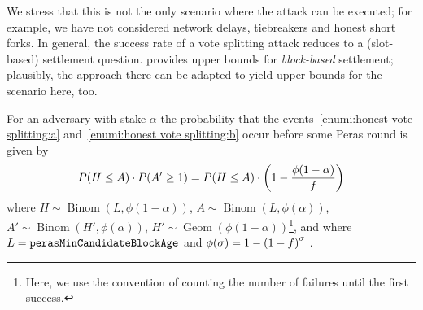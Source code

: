 We stress that this is not the only scenario where the attack can be executed; for example, we have not considered network delays, tiebreakers and honest short forks.
In general, the success rate of a vote splitting attack reduces to a (slot-based) settlement question. \Cite{gavzi2023practical} provides upper bounds for \emph{block-based} settlement; plausibly, the approach there can be adapted to yield upper bounds for the scenario here, too.

\begin{lemma}\label{lemma:honest vote splitting prob}
  For an adversary with stake $\alpha$ the probability that the events~\ref{enumi:honest vote splitting:a} and~\ref{enumi:honest vote splitting:b} occur before some Peras round is given by
  \[ P(H\le A) \cdot P(A' \ge 1) = P(H\le A) \cdot \left(1- \frac{\phi(1-\alpha)}{f}\right) \]
  where $H\sim\operatorname{Binom}(L,\phi(1-\alpha))$, $A\sim\operatorname{Binom}(L,\phi(\alpha))$, $A' \sim \operatorname{Binom}(H',\phi(\alpha))$, $H' \sim \operatorname{Geom}(\phi(1-\alpha))$\footnote{Here, we use the convention of counting the number of failures until the first success.}, and where $L= \mathtt{perasMinCandidateBlockAge}$ and $\phi(\sigma) = 1-{(1-f)}^\sigma$ \parencite[(1)]{david2018ouroboros}.
\end{lemma}

